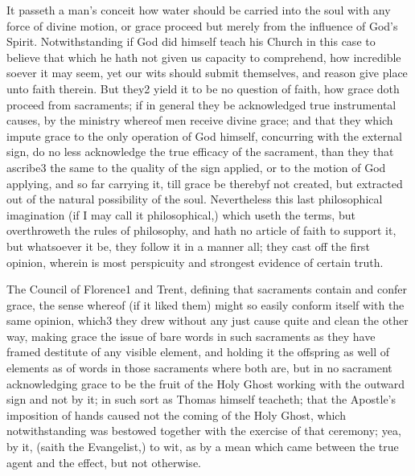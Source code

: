 It passeth a man’s conceit how water should be carried into the soul with any force of divine motion, or grace proceed but merely from the influence of God’s Spirit. Notwithstanding if God did himself teach his Church in this case to believe that which he hath not given us capacity to comprehend, how incredible soever it may seem, yet our wits should submit themselves, and reason give place unto faith therein. But they2 yield it to be no question of faith, how grace doth proceed from sacraments; if in general they be acknowledged true instrumental causes, by the ministry whereof men receive divine grace; and that they which impute grace to the only operation of God himself, concurring with the external sign, do no less acknowledge the true efficacy of the sacrament, than they that ascribe3 the same to the quality of the sign  applied, or to the motion of God applying, and so far carrying it, till grace be therebyf not created, but extracted out of the natural possibility of the soul. Nevertheless this last philosophical imagination (if I may call it philosophical,) which useth the terms, but overthroweth the rules of philosophy, and hath no article of faith to support it, but whatsoever it be, they follow it in a manner all; they cast off the first opinion, wherein is most perspicuity and strongest evidence of certain truth.

The Council of Florence1 and Trent, defining that sacraments contain and confer grace, the sense whereof (if it liked them) might so easily conform itself with the same opinion, which3 they drew without any just cause quite and clean the other way, making grace the issue of bare words in such sacraments as they have framed destitute of any visible element, and holding it the offspring as well of elements as of words in those sacraments where both are, but in no sacrament acknowledging grace to be the fruit of the Holy Ghost working with the outward sign and not by it; in such sort as Thomas himself teacheth; that the Apostle’s imposition of hands caused not the coming of the Holy Ghost, which notwithstanding was bestowed together with the exercise of that ceremony; yea, by it, (saith the Evangelist,) to wit, as by a mean which came between the true agent and the effect, but not otherwise.

